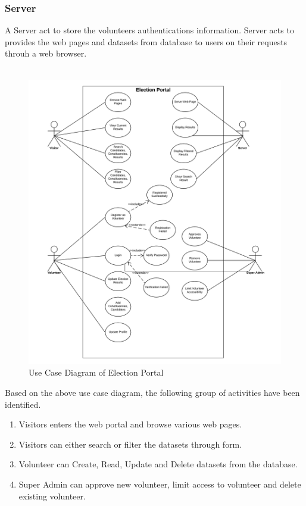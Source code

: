 \documentclass[12pt, a4paper, titlepage]{article}
\begin{document}
\subsubsection{Server} 
A Server act to store the volunteers authentications information. Server acts to provides the web pages and datasets from database to users on their requests throuh a web browser. \\ \\
\begin{figure}
	\begin{center}
	\includegraphics[scale=0.4]{election_portal_use_case_diagram.png}
	\caption{Use Case Diagram of Election Portal}
	\end{center}
\end{figure}
Based on the above use case diagram, the following group of activities have been identified.
\begin{enumerate}
\item Visitors enters the web portal and browse various web pages.
\item Visitors can either search or filter the datasets through form.
\item Volunteer can Create, Read, Update and Delete datasets from the database.
\item Super Admin can approve new volunteer, limit access to volunteer and delete existing volunteer.
\end{enumerate}
\end{document}
